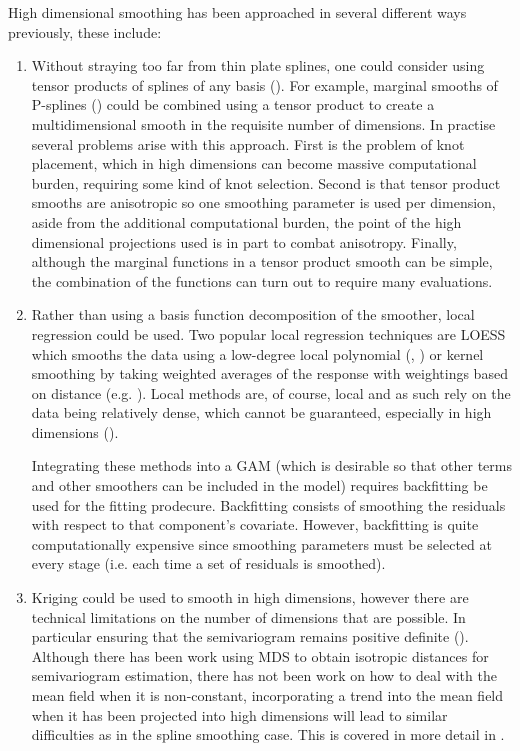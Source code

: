 High dimensional smoothing has been approached in several different ways previously, these include:
\begin{enumerate}
   \item Without straying too far from thin plate splines, one could consider using tensor products of splines of any basis (). For example, marginal smooths of P-splines () could be combined using a tensor product to create a multidimensional smooth in the requisite number of dimensions. In practise several problems arise with this approach. First is the problem of knot placement, which in high dimensions can become massive computational burden, requiring some kind of knot selection. Second is that tensor product smooths are anisotropic so one smoothing parameter is used per dimension, aside from the additional computational burden, the point of the high dimensional projections used is in part to combat anisotropy. Finally, although the marginal functions in a tensor product smooth can be simple, the combination of the functions can turn out to require many evaluations.
   \item Rather than using a basis function decomposition of the smoother, local regression could be used. Two popular local regression techniques are LOESS which smooths the data using a low-degree local polynomial  (\cite{loess1}, \cite{loess2}) or kernel smoothing by taking weighted averages of the response with weightings based on distance (e.g. \cite[pp. 194-200]{elements}). Local methods are, of course, local and as such rely on the data being relatively dense, which cannot be guaranteed, especially in high dimensions (\cite[p. 200]{elements}). 

Integrating these methods into a GAM (which is desirable so that other terms and other smoothers can be included in the model) requires backfitting be used for the fitting prodecure. Backfitting consists of smoothing the residuals with respect to that component's covariate. However, backfitting is quite computationally expensive since smoothing parameters must be selected at every stage (i.e. each time a set of residuals is smoothed).

   \item Kriging could be used to smooth in high dimensions, however there are technical limitations on the number of dimensions that are possible. In particular ensuring that the semivariogram remains positive definite (\cite{boisvert}). Although there has been work using MDS to obtain isotropic distances for semivariogram estimation, there has not been work on how to deal with the mean field when it is non-constant, incorporating a trend into the mean field when it has been projected into high dimensions will lead to similar difficulties as in the spline smoothing case. This is covered in more detail in .
\end{enumerate}

